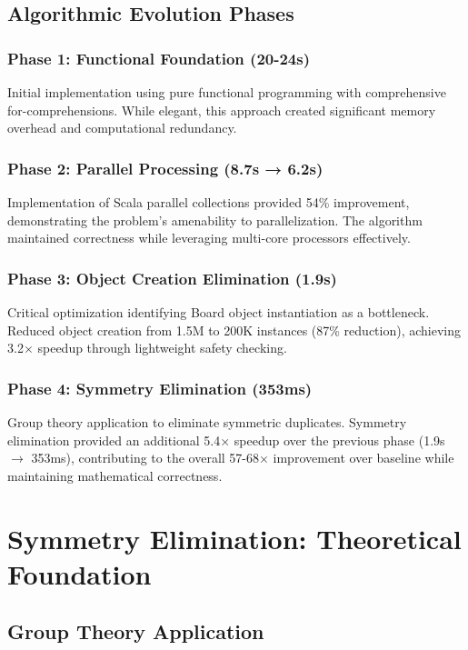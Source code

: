 \documentclass[12pt,a4paper]{article}
\theoremstyle{definition}
\begin{document}
\subsection{Algorithmic Evolution Phases}

\subsubsection{Phase 1: Functional Foundation (20-24s)}
Initial implementation using pure functional programming with comprehensive for-comprehensions. While elegant, this approach created significant memory overhead and computational redundancy.

\subsubsection{Phase 2: Parallel Processing (8.7s → 6.2s)}
Implementation of Scala parallel collections provided 54\% improvement, demonstrating the problem's amenability to parallelization. The algorithm maintained correctness while leveraging multi-core processors effectively.

\subsubsection{Phase 3: Object Creation Elimination (1.9s)}
Critical optimization identifying Board object instantiation as a bottleneck. Reduced object creation from 1.5M to 200K instances (87\% reduction), achieving 3.2$\times$ speedup through lightweight safety checking.

\subsubsection{Phase 4: Symmetry Elimination (353ms)}
Group theory application to eliminate symmetric duplicates. Symmetry elimination provided an additional 5.4$\times$ speedup over the previous phase (1.9s $\rightarrow$ 353ms), contributing to the overall 57-68$\times$ improvement over baseline while maintaining mathematical correctness.

\section{Symmetry Elimination: Theoretical Foundation}

\subsection{Group Theory Application}
\end{document}
